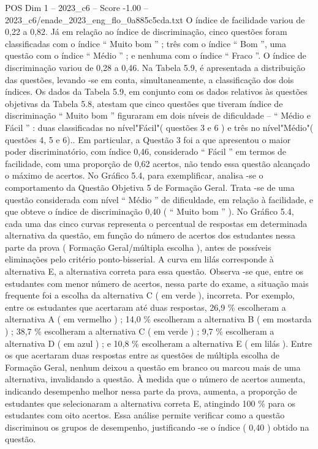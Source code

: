 \begin{textsample}{POS Dim 1 – 2023\_c6 – Score -1.00 – 2023\_c6/enade\_2023\_eng\_flo\_0a885c5cda.txt}
O índice de facilidade variou de 0,22 a 0,82.
Já em relação ao índice de discriminação, cinco questões foram classificadas com o índice “ Muito bom ” ; três com o índice “ Bom ”, uma questão com o índice “ Médio ” ; e nenhuma com o índice “ Fraco ”.
O índice de discriminação variou de 0,28 a 0,46.
Na Tabela 5.9, é apresentada a distribuição das questões, levando -se em conta, simultaneamente, a classificação dos dois índices.
Os dados da Tabela 5.9, em conjunto com os dados relativos às questões objetivas da Tabela 5.8, atestam que cinco questões que tiveram índice de discriminação “ Muito bom ” figuraram em dois níveis de dificuldade – “ Médio e Fácil ” : duas classificadas no nível"Fácil"( questões 3 e 6 ) e três no nível"Médio"( questões 4, 5 e 6)..
Em particular, a Questão 3 foi a que apresentou o maior poder discriminatório, com índice 0,46, considerado “ Fácil ” em termos de facilidade, com uma proporção de 0,62 acertos, não tendo essa questão alcançado o máximo de acertos.
No Gráfico 5.4, para exemplificar, analisa -se o comportamento da Questão Objetiva 5 de Formação Geral.
Trata -se de uma questão considerada com nível “ Médio ” de dificuldade, em relação à facilidade, e que obteve o índice de discriminação 0,40 ( “ Muito bom ” ).
No Gráfico 5.4, cada uma das cinco curvas representa o percentual de respostas em determinada alternativa da questão, em função do número de acertos dos estudantes nessa parte da prova ( Formação Geral/múltipla escolha ), antes de possíveis eliminações pelo critério ponto-bisserial.
A curva em lilás corresponde à alternativa E, a alternativa correta para essa questão.
Observa -se que, entre os estudantes com menor número de acertos, nessa parte do exame, a situação mais frequente foi a escolha da alternativa C ( em verde ), incorreta.
Por exemplo, entre os estudantes que acertaram até duas respostas, 26,9 \% escolheram a alternativa A ( em vermelho ) ; 14,0 \% escolheram a alternativa B ( em mostarda ) ; 38,7 \% escolheram a alternativa C ( em verde ) ; 9,7 \% escolheram a alternativa D ( em azul ) ; e 10,8 \% escolheram a alternativa E ( em lilás ).
Entre os que acertaram duas respostas entre as questões de múltipla escolha de Formação Geral, nenhum deixou a questão em branco ou marcou mais de uma alternativa, invalidando a questão.
À medida que o número de acertos aumenta, indicando desempenho melhor nessa parte da prova, aumenta, a proporção de estudantes que selecionaram a alternativa correta E, atingindo 100 \% para os estudantes com oito acertos.
Essa análise permite verificar como a questão discriminou os grupos de desempenho, justificando -se o índice ( 0,40 ) obtido na questão.

\end{textsample}
